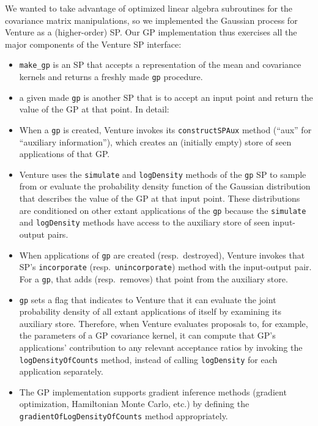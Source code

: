 We wanted to take advantage of optimized linear algebra subroutines
for the covariance matrix manipulations, so we implemented the
Gaussian process for Venture as a (higher-order) \ac{SP}.
Our \ac{GP} implementation thus exercises all the major components of
the Venture \ac{SP} interface:

\begin{itemize}

  \item \texttt{make\_gp} is an \ac{SP} that accepts a representation
  of the mean and covariance kernels and returns a freshly
  made \texttt{gp} procedure.

  \item a given made \texttt{gp} is another \ac{SP} that
  is to accept an input point and return the value of the \ac{GP} at that
  point.  In detail:

  \item When a \texttt{gp} is created, Venture invokes
  its \texttt{constructSPAux} method (``aux'' for ``auxiliary
  information''), which creates an (initially empty) store of seen
  applications of that \ac{GP}.

  \item Venture uses the \texttt{simulate} and \texttt{logDensity}
  methods of the \texttt{gp} \ac{SP} to sample from or evaluate the
  probability density function of the Gaussian distribution that
  describes the value of the \ac{GP} at that input point.  These
  distributions are conditioned on other extant applications of
  the \texttt{gp} because the \texttt{simulate}
  and \texttt{logDensity} methods have access to the auxiliary store
  of seen input-output pairs.

  \item When applications of \texttt{gp} are created (resp.\
  destroyed), Venture invokes that \ac{SP}'s \texttt{incorporate}
  (resp.\ \texttt{unincorporate}) method with the input-output pair.
  For a \texttt{gp}, that adds (resp.\ removes) that point from
  the auxiliary store.

  \item \texttt{gp} sets a flag that indicates to Venture that it can
  evaluate the joint probability density of all extant applications of
  itself by examining its auxiliary store.  Therefore, when Venture
  evaluates proposals to, for example, the parameters of a \ac{GP}
  covariance kernel, it can compute that \ac{GP}'s applications'
  contribution to any relevant acceptance ratios by invoking
  the \texttt{logDensityOfCounts} method, instead of
  calling \texttt{logDensity} for each application separately.

  \item The \ac{GP} implementation supports gradient inference methods
  (gradient optimization, Hamiltonian Monte Carlo, etc.) by defining
  the \texttt{gradientOfLogDensityOfCounts} method appropriately.

\end{itemize}

